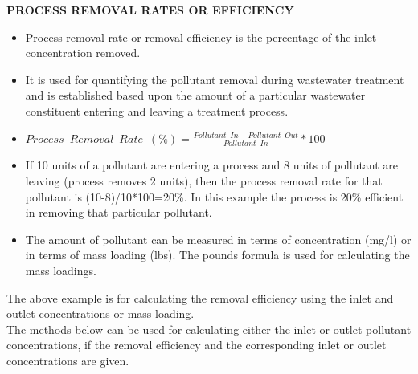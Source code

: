 \documentclass{article}
\begin{document}
\textbf{PROCESS REMOVAL RATES OR EFFICIENCY}\\
\begin{itemize}
\item Process removal rate or removal efficiency is the percentage of the inlet concentration removed.  
\item It is used for quantifying the pollutant removal during wastewater treatment and is established based upon the amount of a particular wastewater constituent entering and leaving a treatment process.

\item $Process \enspace Removal \enspace Rate \enspace (\%) = \frac{Pollutant \enspace  In-Pollutant\enspace  Out}{Pollutant \enspace In}*100$\\

\item If 10 units of a pollutant are entering a process and 8 units of pollutant are leaving (process removes 2 units), then the process removal rate for that pollutant is (10-8)/10*100=20\%.  In this example the process is 20\% efficient in removing that particular pollutant.

\item The amount of pollutant can be measured in terms of concentration (mg/l) or in terms of mass loading (lbs).  The pounds formula is used for calculating the mass loadings.  
\end{itemize}
The above example is for calculating the removal efficiency using the inlet and outlet concentrations or mass loading.\\
The methods below can be used for calculating either the inlet or outlet pollutant concentrations, if the removal efficiency and the corresponding inlet or outlet concentrations are given. 
\end{document}
